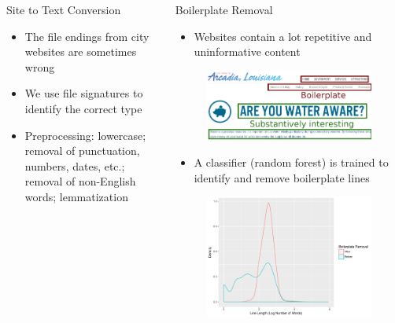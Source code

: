 \documentclass{beamer}
\begin{document}
\begin{frame}[fragile]
\begin{columns}[T]
\begin{column}{.4\textwidth}
\begin{block}{Site to Text Conversion}

\begin{itemize}
\item The file endings from city websites are sometimes wrong
\item We use file signatures to identify the correct type
\item Preprocessing: lowercase; removal of punctuation, numbers, dates, etc.; removal of non-English words; lemmatization
\end{itemize}
\end{block}

\end{column}
\begin{column}{.6\textwidth}
\begin{block}{Boilerplate Removal}
\begin{itemize}
\item Websites contain a lot repetitive and uninformative content
\end{itemize}
\begin{figure}
    \centering
    \includegraphics[width=.8\linewidth]{arcadia_water_TADA_rect.png}
\end{figure}
\begin{itemize}
\item A classifier (random forest) is trained to identify and remove boilerplate lines
\end{itemize}
\begin{minipage}{\textwidth}
  \begin{minipage}[b]{0.49\textwidth}
    \begin{figure}
        \centering
        \includegraphics[width=0.85\linewidth]{boilerplateBeforeAfterNwords.pdf}

\end{figure}
\end{minipage}
\end{minipage}
\end{block}
\end{column}
\end{columns}
\end{frame}
\end{document}
